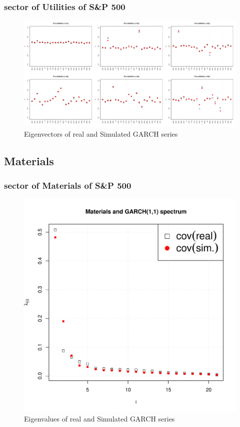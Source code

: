 \documentclass{beamer}
\begin{document}
\begin{frame}
  \frametitle{sector of Utilities of S\&P 500}
  \begin{figure}[htb!]
    \centering
    \includegraphics[width=1.0\linewidth]{Utilities_eigenvectors1.pdf}
    \caption{\scriptsize Eigenvectors of real and Simulated GARCH series}
  \end{figure}
\end{frame}

\subsection{Materials}
\begin{frame}
  \frametitle{sector of Materials of S\&P 500}
  \begin{figure}[htb!]
    \centering
    \includegraphics[scale=0.35]{Materials_eigenvalues.pdf}
    \caption{\scriptsize Eigenvalues of real and Simulated GARCH series}
  \end{figure}
\end{frame}
\end{document}
